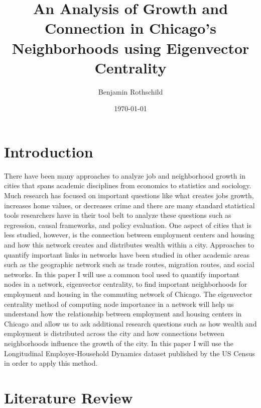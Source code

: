 \documentclass{article}
\title{An Analysis of Growth and Connection in Chicago’s Neighborhoods using Eigenvector Centrality}
\author{Benjamin Rothschild}
\date{\today}
\begin{document}
\begin{titlepage}
\maketitle
\thispagestyle{empty}

\end{titlepage}

\section{Introduction}
 
There have been many approaches to analyze job and neighborhood growth in cities that spans academic disciplines from economics to statistics and sociology.  Much research has focused on important questions like what creates jobs growth, increases home values, or decreases crime and there are many standard statistical tools researchers have in their tool belt to analyze these questions such as regression, causal frameworks, and policy evaluation.  One aspect of cities that is less studied, however, is the connection between employment centers and housing and how this network creates and distributes wealth within a city.  Approaches to quantify important links in networks have been studied in other academic areas such as the geographic network such as trade routes, migration routes, and social networks.  In this paper I will use a common tool used to quantify important nodes in a network, eigenvector centrality, to find important neighborhoods for employment and housing in the commuting network of Chicago.  The eigenvector centrality method of computing node importance in a network will help us understand how the relationship between employment and housing centers in Chicago and allow us to ask additional research questions such as how wealth and employment is distributed across the city and how connections between neighborhoods influence the growth of the city.  In this paper I will use the Longitudinal Employer-Household Dynamics dataset published by the US Census in order to apply this method.

\section{Literature Review}
\end{document}
